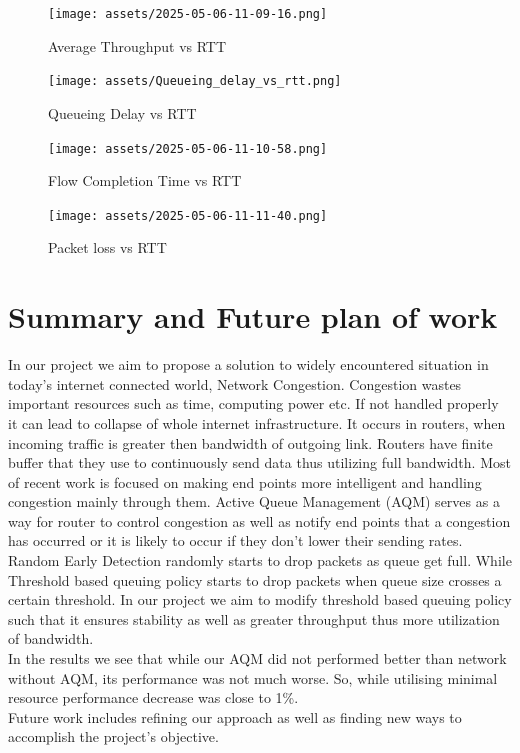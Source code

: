 \begin{figure}[h]
  \centering
  \texttt{[image: assets/2025-05-06-11-09-16.png]}
  \caption{Average Throughput vs RTT}
  \label{fig:myfig9}
\end{figure}


\begin{figure}[h]
  \centering
  \texttt{[image: assets/Queueing\_delay\_vs\_rtt.png]}
  \caption{Queueing Delay vs RTT}
  \label{fig:myfig10}
\end{figure}

 
\begin{figure}[h]
  \centering
  \texttt{[image: assets/2025-05-06-11-10-58.png]}
  \caption{Flow Completion Time vs RTT}
  \label{fig:myfig11}
\end{figure}


\begin{figure}[h]
  \centering
  \texttt{[image: assets/2025-05-06-11-11-40.png]}
  \caption{Packet loss vs RTT}
  \label{fig:myfig12}
\end{figure}



\clearpage
\section{Summary and Future plan of work}
In our project we aim to propose a solution to widely encountered situation in today's internet connected world, Network Congestion. Congestion wastes important resources such as time, computing power etc. If not handled properly it can lead to collapse of whole internet infrastructure. It occurs in routers, when incoming traffic is greater then bandwidth of outgoing link. Routers have finite buffer that they use to continuously send data thus utilizing full bandwidth. Most of recent work is focused on making end points more intelligent and handling congestion mainly through them. Active Queue Management (AQM) serves as a way for router to control congestion as well as notify end points that a congestion has occurred or it is likely to occur if they don't lower their sending rates. Random Early Detection randomly starts to drop packets as queue get full. While Threshold based queuing policy starts to drop packets when queue size crosses a certain threshold. In our project we aim to modify threshold based queuing policy such that it ensures stability as well as greater throughput thus more utilization of bandwidth.\\
In the results we see that while our AQM did not performed better than network without AQM, its performance was not much worse. So, while utilising minimal resource performance decrease was close to 1\%. \\ 
Future work includes refining our approach as well as finding new ways to accomplish the project's objective. \\

\clearpage


